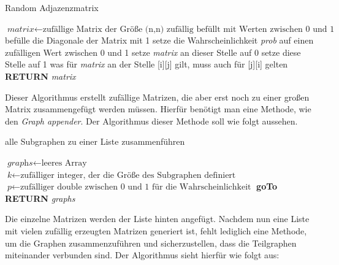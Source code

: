 \begin{algorithm}
\caption{Random Adjazenzmatrix}\label{randomAdjacency}
\begin{algorithmic}[1]
\State $\textit{matrix} \gets \text{zufällige Matrix der Größe (n,n) zufällig befüllt mit Werten zwischen 0 und 1}$
\State befülle die Diagonale der Matrix mit 1
\State setze die Wahrscheinlichkeit \textit{prob} auf einen zufälligen Wert zwischen 0 und 1
\State setze \textit{matrix} an dieser Stelle auf 0
\Else 
\State setze diese Stelle auf 1
\EndIf
\EndFor
\EndFor
{}
\State was für \textit{matrix} an der Stelle [i][j] gilt, muss auch für [j][i] gelten
\State \textbf{RETURN} \textit{matrix}
\EndFor
\EndProcedure
\end{algorithmic}
\end{algorithm}

Dieser Algorithmus erstellt zufällige Matrizen, die aber erst noch zu einer großen Matrix zusammengefügt werden müssen. Hierfür benötigt man eine Methode, wie den \textit{Graph appender}. Der Algorithmus dieser Methode soll wie folgt aussehen. 

\begin{algorithm}
\caption{alle Subgraphen zu einer Liste zusammenführen}\label{GraphAppender}
\begin{algorithmic}[1]
\State $\textit{graphs} \gets \text{leeres Array}$
\State $\textit{k} \gets \text{zufälliger integer, der die Größe des Subgraphen definiert}$
\State $\textit{p} \gets \text{zufälliger double zwischen 0 und 1 für die Wahrscheinlichkeit}$
\State \textbf{goTo} 
\State {} 
\State \textbf{RETURN} \textit{graphs}
\EndFor
\EndProcedure
\end{algorithmic}
\end{algorithm}

\newpage
Die einzelne Matrizen werden der Liste hinten angefügt.
Nachdem nun eine Liste mit vielen zufällig erzeugten Matrizen generiert ist, fehlt lediglich eine Methode, um die Graphen zusammenzuführen und sicherzustellen, dass die Teilgraphen miteinander verbunden sind. Der Algorithmus sieht hierfür wie folgt aus:

